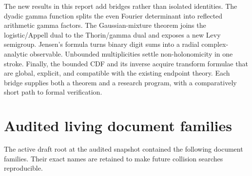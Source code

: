\documentclass[11pt,oneside]{article}
\theoremstyle{definition}
\theoremstyle{remark}
\begin{document}
The new results in this report add bridges rather than isolated identities.  The dyadic gamma
function splits the even Fourier determinant into reflected arithmetic gamma factors.  The
Gaussian-mixture theorem joins the logistic/Appell dual to the Thorin/gamma dual and exposes a
new Levy semigroup.  Jensen's formula turns binary digit sums into a radial complex-analytic
observable.  Unbounded multiplicities settle non-holonomicity in one stroke.  Finally, the
bounded CDF and its inverse acquire transform formulae that are global, explicit, and
compatible with the existing endpoint theory.  Each bridge supplies both a theorem and a
research program, with a comparatively short path to formal verification.

\appendix

\section{Audited living document families}
\label{app:sources}

The active draft root at the audited snapshot contained the following document families.
Their exact names are retained to make future collision searches reproducible.
\end{document}
